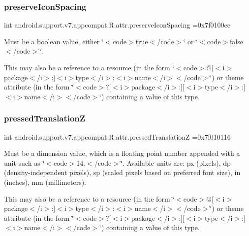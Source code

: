 \subsubsection{\texorpdfstring{preserve\+Icon\+Spacing}{preserveIconSpacing}}
{\footnotesize\ttfamily int android.\+support.\+v7.\+appcompat.\+R.\+attr.\+preserve\+Icon\+Spacing =0x7f0100cc\hspace{0.3cm}{\ttfamily [static]}}

Must be a boolean value, either \char`\"{}$<$code$>$true$<$/code$>$\char`\"{} or \char`\"{}$<$code$>$false$<$/code$>$\char`\"{}. 

This may also be a reference to a resource (in the form \char`\"{}$<$code$>$@\mbox{[}$<$i$>$package$<$/i$>$\+:\mbox{]}$<$i$>$type$<$/i$>$\+:$<$i$>$name$<$/i$>$$<$/code$>$\char`\"{}) or theme attribute (in the form \char`\"{}$<$code$>$?\mbox{[}$<$i$>$package$<$/i$>$\+:\mbox{]}\mbox{[}$<$i$>$type$<$/i$>$\+:\mbox{]}$<$i$>$name$<$/i$>$$<$/code$>$\char`\"{}) containing a value of this type. \mbox{\label{classandroid_1_1support_1_1v7_1_1appcompat_1_1R_1_1attr_a01bd72cc6ce7f445291fc2c14a64a7e3}} 
\subsubsection{\texorpdfstring{pressed\+TranslationZ}{pressedTranslationZ}}
{\footnotesize\ttfamily int android.\+support.\+v7.\+appcompat.\+R.\+attr.\+pressed\+TranslationZ =0x7f010116\hspace{0.3cm}{\ttfamily [static]}}

Must be a dimension value, which is a floating point number appended with a unit such as \char`\"{}$<$code$>$14.\+5sp$<$/code$>$\char`\"{}. Available units are\+: px (pixels), dp (density-\/independent pixels), sp (scaled pixels based on preferred font size), in (inches), mm (millimeters). 

This may also be a reference to a resource (in the form \char`\"{}$<$code$>$@\mbox{[}$<$i$>$package$<$/i$>$\+:\mbox{]}$<$i$>$type$<$/i$>$\+:$<$i$>$name$<$/i$>$$<$/code$>$\char`\"{}) or theme attribute (in the form \char`\"{}$<$code$>$?\mbox{[}$<$i$>$package$<$/i$>$\+:\mbox{]}\mbox{[}$<$i$>$type$<$/i$>$\+:\mbox{]}$<$i$>$name$<$/i$>$$<$/code$>$\char`\"{}) containing a value of this type. \mbox{\label{classandroid_1_1support_1_1v7_1_1appcompat_1_1R_1_1attr_a8538b6aa3f3da37516587bcb65e85d3a}} 
